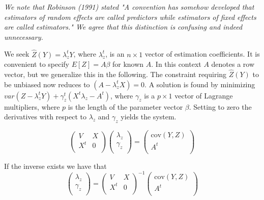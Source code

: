 \documentclass[12pt, a4paper]{article}
\begin{document}
\emph{We note that Robinson (1991) stated "A convention has somehow developed that estimators of random effects are called predictors while estimators of fixed effects are called estimators." We agree that this distinction is confusing and indeed unnecessary.} \\ \bigskip



We seek $\hat{Z}(Y) = \lambda_{z}^{t}Y$, where $ \lambda_{z}^{t}$, is an $n \times 1$ vector of estimation coefficients. It is convenient to specify $E[Z]=A\beta$ for known $A$. In this context $A$ denotes a row vector, but we generalize this in the following. The constraint requiring $\hat{Z}(Y)$ to be unbiased now reduces to $(A -  \lambda_{z}^{t}X) = 0$. A solution is found by minimizing $var(Z -  \lambda_{z}^{t}Y) + \gamma^t_z (X^t\lambda_{z} - A^t)$, where $\gamma_z$ is a $p \times 1$ vector of Lagrange multipliers, where $p$ is the length of the parameter vector $\beta$. Setting to zero the derivatives with respect to $\lambda_{z}$ and $\gamma_z $ yields the system.




\begin{equation}
\left(
  \begin{array}{cc}
    V & X \\
    X^t & 0 \\
  \end{array}
\right)\left(
  \begin{array}{c}
    \lambda_{z}\\
   \gamma_z \\
  \end{array}
\right)=\left(
  \begin{array}{c}
    \mbox{cov}(Y,Z)\\
   A^{t} \\
  \end{array}
\right)
\end{equation}


If the inverse exists we have that
\begin{equation}
\left(
  \begin{array}{c}
    \lambda_{z}\\
   \gamma_z \\
  \end{array}
\right)=\left(
  \begin{array}{cc}
    V & X \\
    X^t & 0 \\
  \end{array}
\right) ^{-1}\left(
  \begin{array}{c}
    \mbox{cov}(Y,Z)\\
   A^{t} \\
  \end{array}
\right)
\end{equation}
\end{document}
